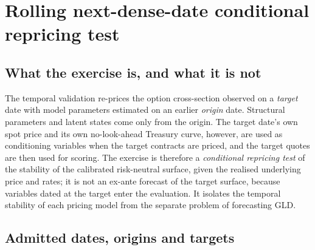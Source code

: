\providecommand{\OOSPending}{\textbf{[pending corrected run]}}
\providecommand{\OOSHookCheck}{\textbf{[check: generated OOS numbers missing]} }
\providecommand{\OOSForecastOrigins}{\OOSPending}
\providecommand{\OOSCommonTargetObservations}{\OOSPending}
\providecommand{\OOSPersistenceTargetObservations}{\OOSPending}
\providecommand{\OOSRTwoPersistBS}{\OOSPending}
\providecommand{\OOSRTwoPersistH}{\OOSPending}
\providecommand{\OOSRTwoPersistB}{\OOSPending}
\providecommand{\OOSRTwoPersistW}{\OOSPending}
\providecommand{\OOSDMPersistBS}{\OOSPending}
\providecommand{\OOSDMPersistH}{\OOSPending}
\providecommand{\OOSDMPersistB}{\OOSPending}
\providecommand{\OOSDMPersistW}{\OOSPending}
\providecommand{\OOSHawkesDatesBeatPersist}{\OOSPending}

\section{Rolling next-dense-date conditional repricing test}
\label{sec:rolling_oos}

\subsection{What the exercise is, and what it is not}
\label{subsec:oos_nature}

The temporal validation re-prices the option cross-section observed on a
\emph{target} date with model parameters estimated on an earlier
\emph{origin} date.  Structural parameters and latent states come only from the
origin.  The target date's own spot price and its own no-look-ahead Treasury
curve, however, are used as conditioning variables when the target contracts
are priced, and the target quotes are then used for scoring.  The exercise is
therefore a \emph{conditional repricing test} of the stability of the
calibrated risk-neutral surface, given the realised underlying price and
rates; it is not an ex-ante forecast of the target surface, because variables
dated at the target enter the evaluation.  It isolates the temporal stability
of each pricing model from the separate problem of forecasting GLD.

\subsection{Admitted dates, origins and targets}
\label{subsec:oos_dates}

